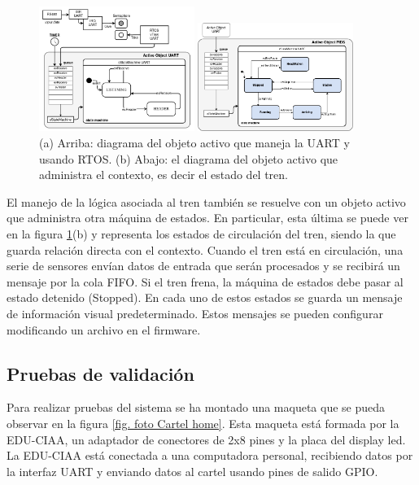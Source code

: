 \documentclass[conference]{IEEEtran}
\begin{document}
\begin{figure}[htbp]
\centerline{\includegraphics[width=0.45\textwidth]{fsmUART2.png}}
\vspace{0.4cm}
\centerline{\includegraphics[width=0.45\textwidth]{fsmTrain.png}}
\caption{(a) Arriba: diagrama del objeto activo que maneja la UART y usando RTOS. (b) Abajo: el diagrama del objeto activo que administra el contexto, es decir el estado del tren.}
\label{fig.fsm}
\end{figure}

El manejo de la lógica asociada al tren también se resuelve con un objeto activo que administra otra máquina de estados. En particular, esta última se puede ver en la figura \ref{fig.fsm}(b) y representa los estados de circulación del tren, siendo la que guarda relación directa con el contexto. Cuando el tren está en circulación, una serie de sensores envían datos de entrada que serán procesados y se recibirá un mensaje por la cola FIFO. Si el tren frena, la máquina de estados debe pasar al estado detenido (Stopped). En cada uno de estos estados se guarda un mensaje de información visual predeterminado. Estos mensajes se pueden configurar modificando un archivo en el firmware. \\


\subsection{Pruebas de validación}

Para realizar pruebas del sistema se ha montado una maqueta que se pueda observar en la figura \ref{fig. foto Cartel home}. Esta maqueta está formada por la EDU-CIAA, un adaptador de conectores de 2x8 pines y la placa del display led. La EDU-CIAA está conectada a una computadora personal, recibiendo datos por la interfaz UART y enviando datos al cartel usando pines de salido GPIO. \\
\end{document}
